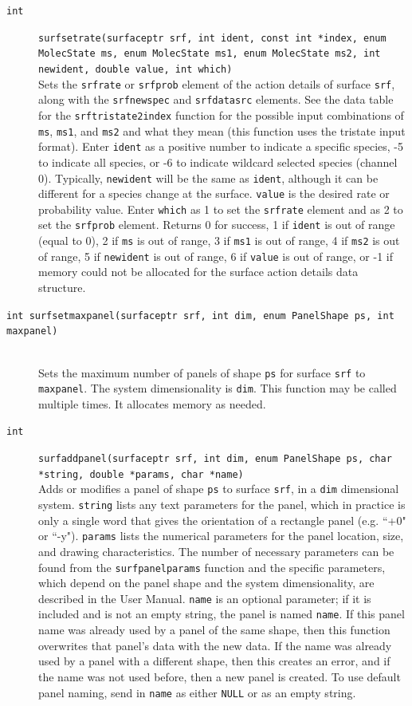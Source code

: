 \documentclass {scrbook}
\newcommand {\ttt} {\texttt}
\begin{document}
\begin{description}
\item[\ttt{int}]
\ttt{surfsetrate(surfaceptr srf, int ident, const int *index, enum MolecState ms, enum MolecState ms1, enum MolecState ms2, int newident, double value, int which)}
\hfill \\
Sets the \ttt{srfrate} or \ttt{srfprob} element of the action details of surface \ttt{srf}, along with the \ttt{srfnewspec} and \ttt{srfdatasrc} elements. See the data table for the \ttt{srftristate2index} function for the possible input combinations of \ttt{ms}, \ttt{ms1}, and \ttt{ms2} and what they mean (this function uses the tristate input format). Enter \ttt{ident} as a positive number to indicate a specific species, -5 to indicate all species, or -6 to indicate wildcard selected species (channel 0). Typically, \ttt{newident} will be the same as \ttt{ident}, although it can be different for a species change at the surface. \ttt{value} is the desired rate or probability value. Enter \ttt{which} as 1 to set the \ttt{srfrate} element and as 2 to set the \ttt{srfprob} element. Returns 0 for success, 1 if \ttt{ident} is out of range (equal to 0), 2 if \ttt{ms} is out of range, 3 if \ttt{ms1} is out of range, 4 if \ttt{ms2} is out of range, 5 if \ttt{newident} is out of range, 6 if \ttt{value} is out of range, or -1 if memory could not be allocated for the surface action details data structure.

\item[\ttt{int surfsetmaxpanel(surfaceptr srf, int dim, enum PanelShape ps, int maxpanel)}]
\hfill \\
Sets the maximum number of panels of shape \ttt{ps} for surface \ttt{srf} to \ttt{maxpanel}. The system dimensionality is \ttt{dim}. This function may be called multiple times. It allocates memory as needed.

\item[\ttt{int}]
\ttt{surfaddpanel(surfaceptr srf, int dim, enum PanelShape ps, char *string, double *params, char *name)}
\hfill \\
Adds or modifies a panel of shape \ttt{ps} to surface \ttt{srf}, in a \ttt{dim} dimensional system. \ttt{string} lists any text parameters for the panel, which in practice is only a single word that gives the orientation of a rectangle panel (e.g. ``+0" or ``-y"). \ttt{params} lists the numerical parameters for the panel location, size, and drawing characteristics. The number of necessary parameters can be found from the \ttt{surfpanelparams} function and the specific parameters, which depend on the panel shape and the system dimensionality, are described in the User Manual. \ttt{name} is an optional parameter; if it is included and is not an empty string, the panel is named \ttt{name}. If this panel name was already used by a panel of the same shape, then this function overwrites that panel's data with the new data. If the name was already used by a panel with a different shape, then this creates an error, and if the name was not used before, then a new panel is created. To use default panel naming, send in \ttt{name} as either \ttt{NULL} or as an empty string.


\end{description}
\end{document}
